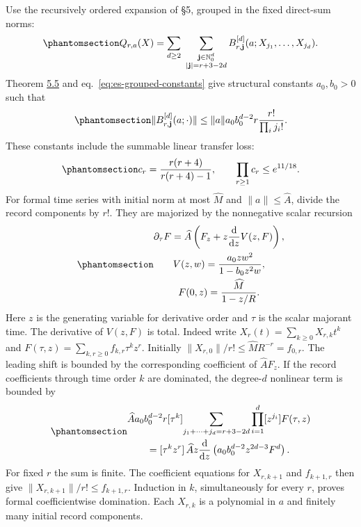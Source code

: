 \documentclass[
  english,
  11pt,
  reqno]{amsart}
\begin{document}
Use the recursively ordered expansion of §5, grouped in the fixed
direct-sum norms:
\begin{equation}\protect\phantomsection\label{eq:es-grouped-expansion}{
 Q_{r,a}(X)=\sum_{d\ge2}\
 \sum_{\substack{\mathbf j\in\mathbb N_0^d\\
                  |\mathbf j|=r+3-2d}}
 B^{[d]}_{r,\mathbf j}(a;X_{j_1},\ldots,X_{j_d}).
}\end{equation} Theorem \hyperref[thm:es-coefficients]{5.5} and
eq.~\ref{eq:es-grouped-constants} give structural constants
\(a_0,b_0>0\) such that
\begin{equation}\protect\phantomsection\label{eq:es-grouped-budget}{
 \|B^{[d]}_{r,\mathbf j}(a;\cdot)\|
 \le\|a\|a_0b_0^{d-2}r\frac{r!}{\prod_i j_i!}.
}\end{equation} These constants include the summable linear transfer
loss:
\begin{equation}\protect\phantomsection\label{eq:es-transfer-product}{
 c_r=\frac{r(r+4)}{r(r+4)-1},\qquad
 \prod_{r\ge1}c_r\le e^{11/18}.
}\end{equation} For formal time series with initial norm at most
\(\widehat M\) and \(\|a\|\le\widehat A\), divide the record components
by \(r!\). They are majorized by the nonnegative scalar recursion
\begin{equation}\protect\phantomsection\label{eq:es-flow-majorant}{\begin{gathered}
\partial_\tau F
   =\widehat A\left(F_z+z\frac{\mathrm d}{\mathrm dz}V(z,F)\right), \\
V(z,w)=\frac{a_0zw^2}{1-b_0z^2w}, \\
F(0,z)=\frac{\widehat M}{1-z/R}.
\end{gathered}}\end{equation} Here \(z\) is the generating variable for derivative
order and \(\tau\) is the scalar majorant time. The derivative of
\(V(z,F)\) is total. Indeed write \(X_r(t)=\sum_{k\ge0}X_{r,k}t^k\) and
\(F(\tau,z)=\sum_{k,r\ge0}f_{k,r}\tau^kz^r\). Initially
\(\|X_{r,0}\|/r!\le\widehat M R^{-r}=f_{0,r}\). The leading shift is
bounded by the corresponding coefficient of \(\widehat A F_z\). If the
record coefficients through time order \(k\) are dominated, the
degree-\(d\) nonlinear term is bounded by
\begin{equation}\protect\phantomsection\label{eq:es-flow-majorization}{
 \begin{aligned}
 &\widehat A a_0b_0^{d-2}r
 [\tau^k]\!
 \sum_{j_1+\cdots+j_d=r+3-2d}
       \prod_{i=1}^d[z^{j_i}]F(\tau,z)\\
 &\qquad= [\tau^kz^r]\,\widehat A z\frac{\mathrm d}{\mathrm dz}
       \left(a_0b_0^{d-2}z^{2d-3}F^d\right).
 \end{aligned}
}\end{equation} For fixed \(r\) the sum is finite. The coefficient
equations for \(X_{r,k+1}\) and \(f_{k+1,r}\) then give
\(\|X_{r,k+1}\|/r!\le f_{k+1,r}\). Induction in \(k\), simultaneously
for every \(r\), proves formal coefficientwise domination. Each
\(X_{r,k}\) is a polynomial in \(a\) and finitely many initial record
components.
\end{document}
